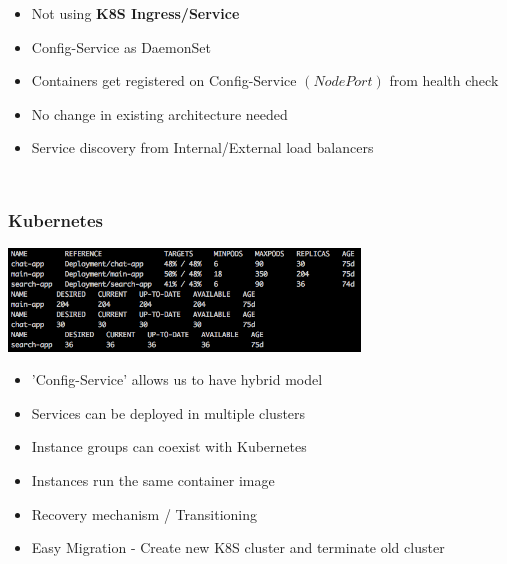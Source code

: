 \documentclass[12pt]{beamer}
\begin{document}
\begin{frame}
\begin{columns}
            \begin{itemize}
                \item Not using \textbf{K8S Ingress/Service}
                    \pause
                \item Config-Service as DaemonSet
                \item Containers get registered on Config-Service $(NodePort)$ from health check
                    \pause
                \item No change in existing architecture needed
                \item Service discovery from Internal/External load balancers
            \end{itemize}
        \end{columns}
    \end{frame}

    \begin{frame}
        \frametitle{Kubernetes}
        \begin{center}
            \includegraphics[width=0.7\textwidth]{images/kubernetes-status.png}
        \end{center}
        \begin{itemize}
            \item 'Config-Service' allows us to have hybrid model
            \item Services can be deployed in multiple clusters
            \item Instance groups can coexist with Kubernetes
            \pause
            \item Instances run the same container image
            \pause
            \item Recovery mechanism / Transitioning
            \pause
            \item Easy Migration - Create new K8S cluster and terminate old cluster
        \end{itemize}
    \end{frame}
\end{document}
